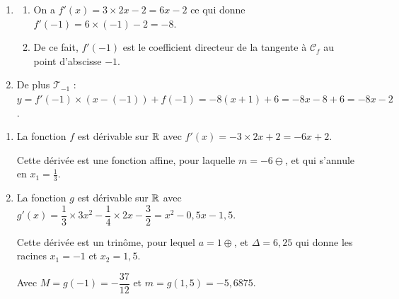 \documentclass[a4paper,11pt]{article}
\begin{document}
\medskip



\begin{enumerate}
	\item 
	\begin{enumerate}
		\item On a $f'(x)=3\times2x-2=6x-2$ ce qui donne $f'(-1)=6\times(-1)-2=-8$.
		\item De ce fait,  $f'(-1)$ est le coefficient directeur de la tangente à $\mathscr{C}_f$ au point d’abscisse $-1$.
	\end{enumerate}
	\item De plus $\mathscr{T}_{-1}$ : $y=f'(-1) \times (x-(-1)) + f(-1) = -8(x+1) + 6 = -8x-8+6 = -8x-2$.
\end{enumerate}

\medskip


\begin{enumerate}
	\item La fonction $f$ est dérivable sur $\R$ avec $f'(x)=-3\times2x+2=-6x+2$.
	
	Cette dérivée est une fonction affine, pour laquelle $m=-6\ominus$, et qui s'annule en $x_1=\tfrac{1}{3}$.
	
	\begin{center}
	\end{center}
	\item La fonction $g$ est dérivable sur $\R$ avec $g'(x)=\dfrac{1}{3} \times 3x^2-\dfrac14 \times 2x - \dfrac32 = x^2-0,5x-1,5$.
	
	Cette dérivée est un trinôme, pour lequel $a=1\oplus$, et $\Delta=6,25$ qui donne les racines $x_1=-1$ et $x_2=1,5$.
	
	\begin{center}
		
		Avec $M=g(-1)=-\dfrac{37}{12}$ et $m=g(1,5)=-5,6875$.
	\end{center}
\end{enumerate}
\end{document}
